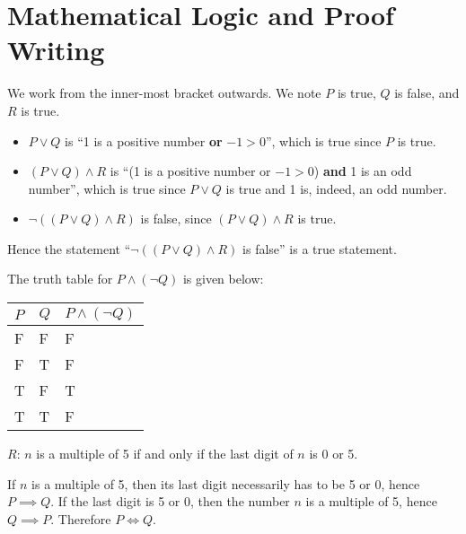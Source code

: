 \section{Mathematical Logic and Proof Writing}
\begin{questions}
    \item We work from the inner-most bracket outwards. We note $P$ is true, $Q$ is false, and $R$ is true.
    \begin{itemize}
        \item $P \lor Q$ is ``1 is a positive number \textbf{or} $-1 > 0$'', which is true since $P$ is true.
        \item $(P \lor Q) \land R$ is ``(1 is a positive number or $-1 > 0$) \textbf{and} 1 is an odd number'', which is true since $P \lor Q$ is true and 1 is, indeed, an odd number.
        \item $\lnot((P \lor Q) \land R)$ is false, since $(P \lor Q) \land R$ is true.
    \end{itemize}
    Hence the statement ``$\lnot((P \lor Q) \land R)$ is false'' is a true statement.
    
    \item The truth table for $P \land (\lnot Q)$ is given below:
    \begin{table}[h]
        \centering
        \begin{tabular}{|l|l||l|}
            \hline
            $P$ & $Q$ & $P\land (\lnot Q)$ \\ \hline
            F   & F   & F                  \\ \hline
            F   & T   & F                  \\ \hline
            T   & F   & T                  \\ \hline
            T   & T   & F                  \\ \hline
        \end{tabular}
    \end{table}
    
    \item \begin{partquestions}{\roman*}
        \item $R$: $n$ is a multiple of 5 if and only if the last digit of $n$ is 0 or 5.
        \item If $n$ is a multiple of 5, then its last digit necessarily has to be 5 or 0, hence $P \implies Q$. If the last digit is 5 or 0, then the number $n$ is a multiple of 5, hence $Q \implies P$. Therefore $P \iff Q$.
    \end{partquestions}
    

\end{questions}
